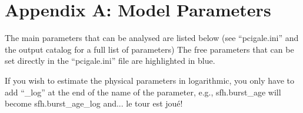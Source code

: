 \section*{Appendix A: Model Parameters}
\label{app:par}
The main parameters that can be analysed are listed below (see ``pcigale.ini'' and the output catalog for a full list of parameters)
The free parameters that can be set directly in the ``pcigale.ini'' file are highlighted in blue. 

If you wish to estimate the physical parameters in logarithmic, you only have to add ``\_log'' at the end of the name of the parameter, e.g., sfh.burst\_age will become sfh.burst\_age\_log
and... le tour est jou\'e!

